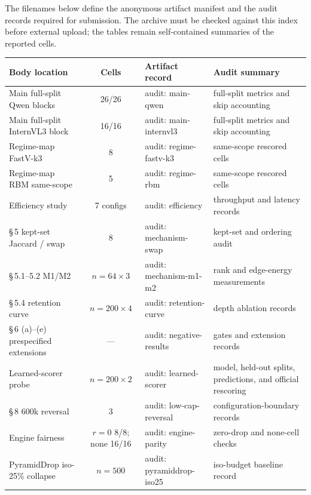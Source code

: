 \documentclass[journal]{IEEEtran}
\begin{document}
\noindent The filenames below define the anonymous artifact manifest and the
audit records required for submission. The archive must be checked against this
index before external upload; the tables remain self-contained summaries of the
reported cells.

\begin{table}[ht]
  \centering
  \small
  \begin{tabular}{@{}p{3.0cm} c p{4.6cm} p{4.6cm}@{}}
    \toprule
    Body location & Cells & Artifact record & Audit summary \\
    \midrule
    Main full-split Qwen blocks       & 26/26        & audit: main-qwen & full-split metrics and skip accounting \\
    Main full-split InternVL3 block   & 16/16        & audit: main-internvl3 & full-split metrics and skip accounting \\
    Regime-map FastV-k3               & 8            & audit: regime-fastv-k3 & same-scope rescored cells \\
    Regime-map RBM same-scope         & 5            & audit: regime-rbm & same-scope rescored cells \\
    Efficiency study                  & 7 configs    & audit: efficiency & throughput and latency records \\
    \S\,5 kept-set Jaccard / swap     & 8            & audit: mechanism-swap & kept-set and ordering audit \\
    \S\,5.1--5.2 M1/M2                & $n=64 \times 3$ & audit: mechanism-m1-m2 & rank and edge-energy measurements \\
    \S\,5.4 retention curve           & $n=200 \times 4$ & audit: retention-curve & depth ablation records \\
    \S\,6 (a)--(e) prespecified extensions & ---      & audit: negative-results & gates and extension records \\
    Learned-scorer probe                   & $n=200 \times 2$ & audit: learned-scorer & model, held-out splits, predictions, and official rescoring \\
    \S\,8 600k reversal               & 3            & audit: low-cap-reversal & configuration-boundary records \\
    Engine fairness                   & $r{=}0$ 8/8; none 16/16 & audit: engine-parity & zero-drop and none-cell checks \\
    PyramidDrop iso-25\% collapse     & $n = 500$    & audit: pyramiddrop-iso25 & iso-budget baseline record \\
    \bottomrule
  \end{tabular}
\end{table}
\end{document}
